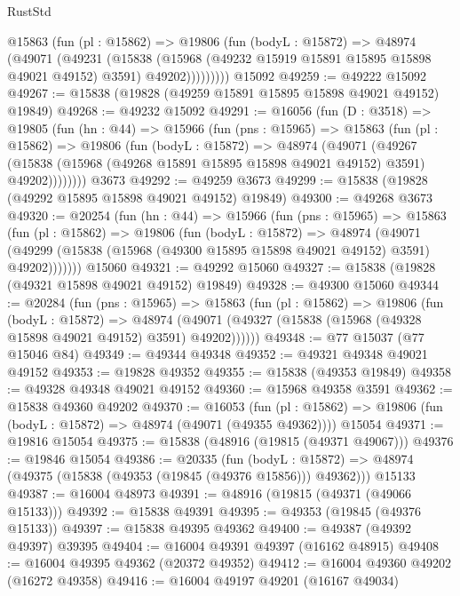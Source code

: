 \begin{lexlean}{RustStd}
\begin{coremodule}
          @15863
            (fun (pl : @15862) =>
            @19806
              (fun (bodyL : @15872) =>
              @48974
                (@49071
                  (@49231
                    (@15838
                      (@15968 (@49232 @15919 @15891 @15895 @15898 @49021 @49152) @3591)
                      @49202)))))))))
    @15092
@49259 := @49222 @15092
@49267 := @15838 (@19828 (@49259 @15891 @15895 @15898 @49021 @49152) @19849)
@49268 := @49232 @15092
@49291 := @16056
    (fun (D : @3518) =>
    @19805
      (fun (hn : @44) =>
      @15966
        (fun (pns : @15965) =>
        @15863
          (fun (pl : @15862) =>
          @19806
            (fun (bodyL : @15872) =>
            @48974
              (@49071
                (@49267
                  (@15838 (@15968 (@49268 @15891 @15895 @15898 @49021 @49152) @3591) @49202))))))))
    @3673
@49292 := @49259 @3673
@49299 := @15838 (@19828 (@49292 @15895 @15898 @49021 @49152) @19849)
@49300 := @49268 @3673
@49320 := @20254
    (fun (hn : @44) =>
    @15966
      (fun (pns : @15965) =>
      @15863
        (fun (pl : @15862) =>
        @19806
          (fun (bodyL : @15872) =>
          @48974
            (@49071
              (@49299 (@15838 (@15968 (@49300 @15895 @15898 @49021 @49152) @3591) @49202)))))))
    @15060
@49321 := @49292 @15060
@49327 := @15838 (@19828 (@49321 @15898 @49021 @49152) @19849)
@49328 := @49300 @15060
@49344 := @20284
    (fun (pns : @15965) =>
    @15863
      (fun (pl : @15862) =>
      @19806
        (fun (bodyL : @15872) =>
        @48974 (@49071 (@49327 (@15838 (@15968 (@49328 @15898 @49021 @49152) @3591) @49202))))))
@49348 := @77 @15037 (@77 @15046 @84)
@49349 := @49344 @49348
@49352 := @49321 @49348 @49021 @49152
@49353 := @19828 @49352
@49355 := @15838 (@49353 @19849)
@49358 := @49328 @49348 @49021 @49152
@49360 := @15968 @49358 @3591
@49362 := @15838 @49360 @49202
@49370 := @16053
    (fun (pl : @15862) => @19806 (fun (bodyL : @15872) => @48974 (@49071 (@49355 @49362))))
    @15054
@49371 := @19816 @15054
@49375 := @15838 (@48916 (@19815 (@49371 @49067)))
@49376 := @19846 @15054
@49386 := @20335
    (fun (bodyL : @15872) => @48974 (@49375 (@15838 (@49353 (@19845 (@49376 @15856))) @49362)))
    @15133
@49387 := @16004 @48973
@49391 := @48916 (@19815 (@49371 (@49066 @15133)))
@49392 := @15838 @49391
@49395 := @49353 (@19845 (@49376 @15133))
@49397 := @15838 @49395 @49362
@49400 := @49387 (@49392 @49397) @39395
@49404 := @16004 @49391 @49397 (@16162 @48915)
@49408 := @16004 @49395 @49362 (@20372 @49352)
@49412 := @16004 @49360 @49202 (@16272 @49358)
@49416 := @16004 @49197 @49201 (@16167 @49034)

\end{coremodule}
\end{lexlean}
